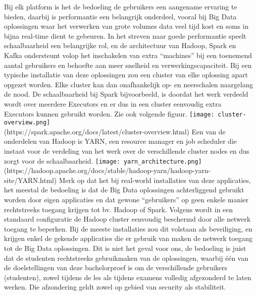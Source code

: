 Bij elk platform is het de bedoeling de gebruikers een aangename ervaring te bieden, daarbij is performantie een belangrijk onderdeel, vooral bij Big Data oplossingen waar het verwerken van grote volumes data veel tijd kost en soms in bijna real-time dient te gebeuren.
In het streven naar goede performantie speelt schaalbaarheid een belangrijke rol, en de architectuur van Hadoop, Spark en Kafka ondersteunt volop het inschakelen van extra ``machines'' bij een toenemend aantal gebruikers en behoefte aan meer snelheid en verwerkingscapaciteit.
Bij een typische installatie van deze oplossingen zou een cluster van elke oplossing apart opgezet worden. Elke cluster kan dan onafhankelijk op- en neerschalen naargelang de nood.
\newline
De schaalbaarheid bij Spark bijvoorbeeld, is doordat het werk verdeeld wordt over meerdere Executors en er dus in een cluster eenvoudig extra Executors kunnen gebruikt worden. Zie ook volgende figuur.
\newline
\texttt{[image: cluster-overview.png]}
\\
(https://spark.apache.org/docs/latest/cluster-overview.html)
\newline
Een van de onderdelen van Hadoop is YARN, een resource manager en job scheduler die instaat voor de verdeling van het werk over de verschillende cluster nodes en dus zorgt voor de schaalbaarheid.
\newline
\texttt{[image: yarn\_architecture.png]}
\\
(https://hadoop.apache.org/docs/stable/hadoop-yarn/hadoop-yarn-site/YARN.html)
\newline
\newline
Merk op dat het bij real-world installaties van deze applicaties, het meestal de bedoeling is dat de Big Data oplossingen achterliggend gebruikt worden door eigen applicaties en dat gewone ``gebruikers'' op geen enkele manier rechtstreeks toegang krijgen tot bv. Hadoop of Spark.
\newline
Volgens \autocite{Hadoop2023} wordt in een standaard configuratie de Hadoop cluster eenvoudig beschermd door alle netwerk toegang te beperken. 
Bij de meeste installaties zou dit volstaan als beveiliging, en krijgen enkel de gekende applicaties die er gebruik van maken de netwerk toegang tot de Big Data oplossingen.
\newline
\newline
Dit is niet het geval voor ons, de bedoeling is juist dat de studenten rechtstreeks gebruikmaken van de oplossingen, waarbij één van de doelstellingen van deze bachelorproef is om de verschillende gebruikers (studenten), zowel tijdens de les als tijdens examens volledig afgezonderd te laten werken. Die afzondering geldt zowel op gebied van security als stabiliteit.

